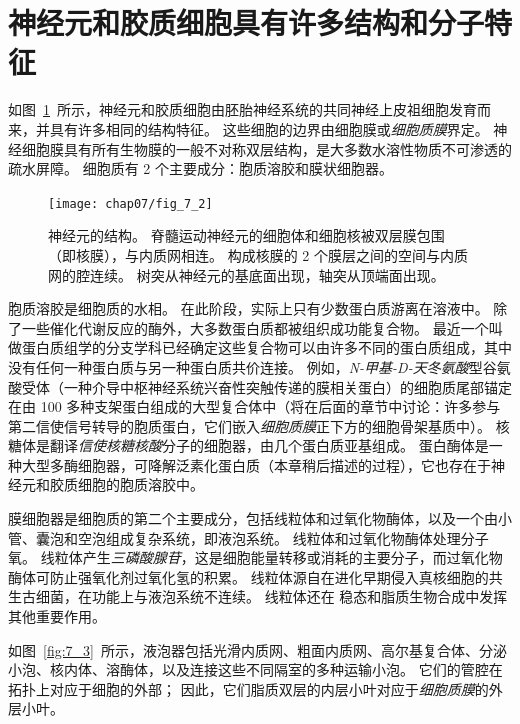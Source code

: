 \section{神经元和胶质细胞具有许多结构和分子特征}

如图~\ref{fig:7_2}~所示，神经元和胶质细胞由胚胎神经系统的共同神经上皮祖细胞发育而来，并具有许多相同的结构特征。
这些细胞的边界由细胞膜或\textit{细胞质膜}界定。
神经细胞膜具有所有生物膜的一般不对称双层结构，是大多数水溶性物质不可渗透的疏水屏障。
细胞质有 2 个主要成分：胞质溶胶和膜状细胞器。


\begin{figure}[htbp]
	\centering
	\texttt{[image: chap07/fig\_7\_2]}
	\caption{神经元的结构。
		脊髓运动神经元的细胞体和细胞核被双层膜包围（即核膜），与内质网相连。
		构成核膜的 2 个膜层之间的空间与内质网的腔连续。
		树突从神经元的基底面出现，轴突从顶端面出现\cite{williams1989bannister}。}
	\label{fig:7_2}
\end{figure}


胞质溶胶是细胞质的水相。
在此阶段，实际上只有少数蛋白质游离在溶液中。
除了一些催化代谢反应的酶外，大多数蛋白质都被组织成功能复合物。
最近一个叫做蛋白质组学的分支学科已经确定这些复合物可以由许多不同的蛋白质组成，其中没有任何一种蛋白质与另一种蛋白质共价连接。
例如，\textit{N-甲基-D-天冬氨酸}型谷氨酸受体（一种介导中枢神经系统兴奋性突触传递的膜相关蛋白）的细胞质尾部锚定在由 100 多种支架蛋白组成的大型复合体中（将在后面的章节中讨论：许多参与第二信使信号转导的胞质蛋白，它们嵌入\textit{细胞质膜}正下方的细胞骨架基质中）。
核糖体是翻译\textit{信使核糖核酸}分子的细胞器，由几个蛋白质亚基组成。
蛋白酶体是一种大型多酶细胞器，可降解泛素化蛋白质（本章稍后描述的过程），它也存在于神经元和胶质细胞的胞质溶胶中。


膜细胞器是细胞质的第二个主要成分，包括线粒体和过氧化物酶体，以及一个由小管、囊泡和空泡组成复杂系统，即液泡系统。
线粒体和过氧化物酶体处理分子氧。
线粒体产生\textit{三磷酸腺苷}，这是细胞能量转移或消耗的主要分子，而过氧化物酶体可防止强氧化剂过氧化氢的积累。
线粒体源自在进化早期侵入真核细胞的共生古细菌，在功能上与液泡系统不连续。
线粒体还在  稳态和脂质生物合成中发挥其他重要作用。


如图~\ref{fig:7_3}~所示，液泡器包括光滑内质网、粗面内质网、高尔基复合体、分泌小泡、核内体、溶酶体，以及连接这些不同隔室的多种运输小泡。
它们的管腔在拓扑上对应于细胞的外部；
因此，它们脂质双层的内层小叶对应于\textit{细胞质膜}的外层小叶。


